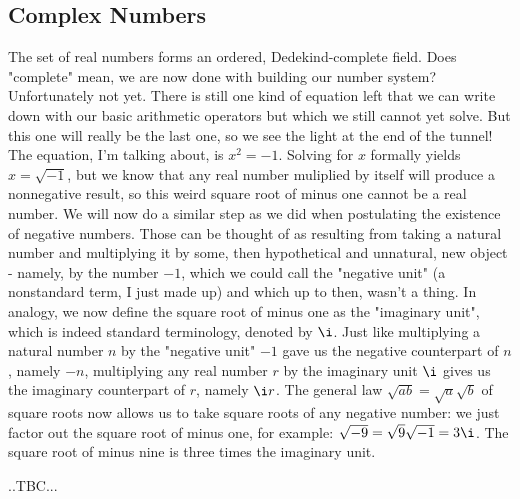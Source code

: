 \subsection{Complex Numbers}
The set of real numbers forms an ordered, Dedekind-complete field. Does "complete" mean, we are now done with building our number system? Unfortunately not yet. There is still one kind of equation left that we can write down with our basic arithmetic operators but which we still cannot yet solve. But this one will really be the last one, so we see the light at the end of the tunnel! The equation, I'm talking about, is $x^2 = -1$. Solving for $x$ formally yields $x = \sqrt{-1}$, but we know that any real number muliplied by itself will produce a nonnegative result, so this weird square root of minus one cannot be a real number. We will now do a similar step as we did when postulating the existence of negative numbers. Those can be thought of as resulting from taking a natural number and multiplying it by some, then hypothetical and unnatural, new object - namely, by the number $-1$, which we could call the "negative unit" (a nonstandard term, I just made up) and which up to then, wasn't a thing. In analogy, we now define the square root of minus one as the "imaginary unit", which is indeed standard terminology, denoted by $\i$. Just like multiplying a natural number $n$ by the "negative unit" $-1$ gave us the negative counterpart of $n$, namely $-n$, multiplying any real number $r$ by the imaginary unit $\i$ gives us the imaginary counterpart of $r$, namely $\i r$. The general law $\sqrt{a b} = \sqrt{a} \sqrt{b}$ of square roots now allows us to take square roots of any negative number: we just factor out the square root of minus one, for example: $\sqrt{-9} = \sqrt{9} \sqrt{-1} = 3 \i$. The square root of minus nine is three times the imaginary unit.

..TBC...

